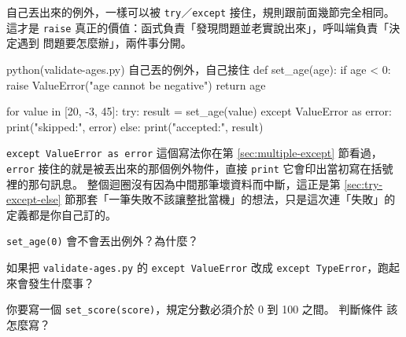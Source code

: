 
自己丟出來的例外，一樣可以被 \texttt{try}／\texttt{except} 接住，規則跟前面幾節完全相同。
這才是 \texttt{raise} 真正的價值：函式負責「發現問題並老實說出來」，呼叫端負責「決定遇到
問題要怎麼辦」，兩件事分開。

\begin{example}{python}{(validate-ages.py) 自己丟的例外，自己接住}
def set_age(age):
    if age < 0:
        raise ValueError("age cannot be negative")
    return age


for value in [20, -3, 45]:
    try:
        result = set_age(value)
    except ValueError as error:
        print("skipped:", error)
    else:
        print("accepted:", result)
\end{example}


\texttt{except ValueError as error} 這個寫法你在第 \ref{sec:multiple-except} 節看過，
\texttt{error} 接住的就是被丟出來的那個例外物件，直接 \texttt{print} 它會印出當初寫在括號
裡的那句訊息。 整個迴圈沒有因為中間那筆壞資料而中斷，這正是第 \ref{sec:try-except-else}
節那套「一筆失敗不該讓整批當機」的想法，只是這次連「失敗」的定義都是你自己訂的。


\begin{drills}[label=drills:raise]
\item \texttt{set\_age(0)} 會不會丟出例外？為什麼？
\item 如果把 \texttt{validate-ages.py} 的 \texttt{except ValueError} 改成
\texttt{except TypeError}，跑起來會發生什麼事？
\item 你要寫一個 \texttt{set\_score(score)}，規定分數必須介於 0 到 100 之間。 判斷條件
該怎麼寫？
\end{drills}

